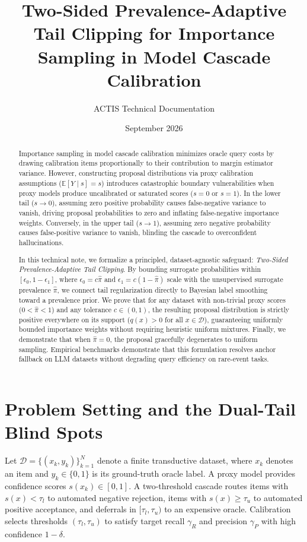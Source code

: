 \documentclass[11pt,a4paper]{article}
\title{\textbf{Two-Sided Prevalence-Adaptive Tail Clipping for Importance Sampling in Model Cascade Calibration}}
\author{ACTIS Technical Documentation}
\date{September 2026}
\newcommand{\D}{\mathcal{D}}
\newcommand{\E}{\mathbb{E}}
\begin{document}
\maketitle

\begin{abstract}
Importance sampling in model cascade calibration minimizes oracle query costs by drawing calibration items proportionally to their contribution to margin estimator variance. However, constructing proposal distributions via proxy calibration assumptions ($\E[Y \mid s] = s$) introduces catastrophic boundary vulnerabilities when proxy models produce uncalibrated or saturated scores ($s = 0$ or $s = 1$). 
In the lower tail ($s \to 0$), assuming zero positive probability causes false-negative variance to vanish, driving proposal probabilities to zero and inflating false-negative importance weights. Conversely, in the upper tail ($s \to 1$), assuming zero negative probability causes false-positive variance to vanish, blinding the cascade to overconfident hallucinations.

In this technical note, we formalize a principled, dataset-agnostic safeguard: \emph{Two-Sided Prevalence-Adaptive Tail Clipping}. By bounding surrogate probabilities within $[\epsilon_0, 1 - \epsilon_1]$, where $\epsilon_0 = c \hat{\pi}$ and $\epsilon_1 = c (1 - \hat{\pi})$ scale with the unsupervised surrogate prevalence $\hat{\pi}$, we connect tail regularization directly to Bayesian label smoothing toward a prevalence prior. 
We prove that for any dataset with non-trivial proxy scores ($0 < \hat{\pi} < 1$) and any tolerance $c \in (0, 1)$, the resulting proposal distribution is strictly positive everywhere on its support ($q(x) > 0$ for all $x \in \D$), guaranteeing uniformly bounded importance weights without requiring heuristic uniform mixtures. Finally, we demonstrate that when $\hat{\pi} = 0$, the proposal gracefully degenerates to uniform sampling. Empirical benchmarks demonstrate that this formulation resolves anchor fallback on LLM datasets without degrading query efficiency on rare-event tasks.
\end{abstract}

\section{Problem Setting and the Dual-Tail Blind Spots}

Let $\D = \{(x_k, y_k)\}_{k=1}^N$ denote a finite transductive dataset, where $x_k$ denotes an item and $y_k \in \{0, 1\}$ is its ground-truth oracle label. A proxy model provides confidence scores $s(x_k) \in [0, 1]$.
A two-threshold cascade routes items with $s(x) < \tau_l$ to automated negative rejection, items with $s(x) \ge \tau_u$ to automated positive acceptance, and deferrals in $[\tau_l, \tau_u)$ to an expensive oracle.
Calibration selects thresholds $(\tau_l, \tau_u)$ to satisfy target recall $\gamma_R$ and precision $\gamma_P$ with high confidence $1 - \delta$.
\end{document}
